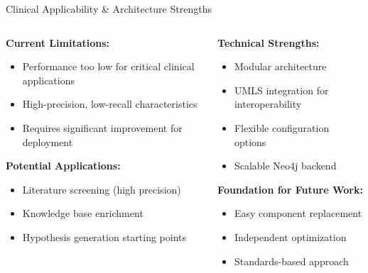 \documentclass[aspectratio=169, 11pt]{beamer}
\begin{document}
\begin{frame}{Clinical Applicability \& Architecture Strengths}
    \begin{columns}
        \begin{column}{0.5\textwidth}
            \textbf{Current Limitations:}
            \begin{itemize}
                \item Performance too low for critical clinical applications
                \item High-precision, low-recall characteristics
                \item Requires significant improvement for deployment
            \end{itemize}
            
            \textbf{Potential Applications:}
            \begin{itemize}
                \item Literature screening (high precision)
                \item Knowledge base enrichment
                \item Hypothesis generation starting points
            \end{itemize}
        \end{column}
        \begin{column}{0.5\textwidth}
            \textbf{Technical Strengths:}
            \begin{itemize}
                \item \textcolor{ulgreen}{Modular architecture}
                \item \textcolor{ulblue}{UMLS integration} for interoperability
                \item \textcolor{nercolor}{Flexible configuration} options
                \item \textcolor{graphcolor}{Scalable Neo4j} backend
            \end{itemize}
            
            \textbf{Foundation for Future Work:}
            \begin{itemize}
                \item Easy component replacement
                \item Independent optimization
                \item Standards-based approach
            \end{itemize}
        \end{column}
    \end{columns}
\end{frame}
\end{document}

